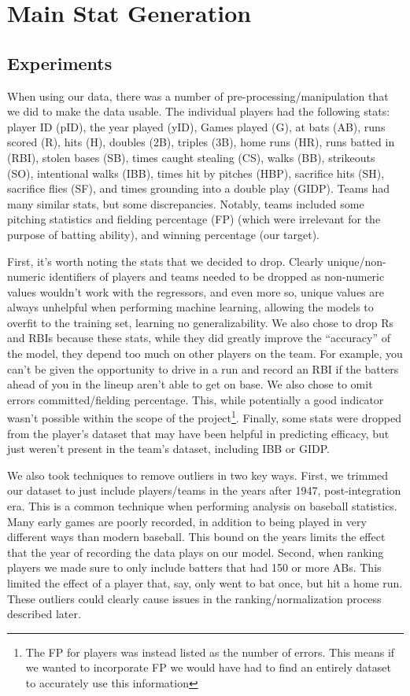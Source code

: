 \documentclass{article}
\begin{document}
\section{Main Stat Generation}
\label{mainstat}

    \subsection{Experiments}
    \label{experiments1}
    
When using our data, there was a number of pre-processing/manipulation that we did to make the data usable. The individual players had the following stats: player ID (pID), the year played (yID), Games played (G), at bats (AB), runs scored (R), hits (H), doubles (2B), triples (3B), home runs (HR), runs batted in (RBI), stolen bases (SB), times caught stealing (CS), walks (BB), strikeouts (SO), intentional walks (IBB), times hit by pitches (HBP), sacrifice hits (SH), sacrifice flies (SF), and times grounding into a double play (GIDP). Teams had many similar stats, but some discrepancies. Notably, teams included some pitching statistics and fielding percentage (FP) (which were irrelevant for the purpose of batting ability), and winning percentage (our target).

First, it’s worth noting the stats that we decided to drop. Clearly unique/non-numeric identifiers of players and teams needed to be dropped as non-numeric values wouldn’t work with the regressors, and even more so, unique values are always unhelpful when performing machine learning, allowing the models to overfit to the training set, learning no generalizability. We also chose to drop Rs and RBIs because these stats, while they did greatly improve the “accuracy” of the model, they depend too much on other players on the team. For example, you can’t be given the opportunity to drive in a run and record an RBI if the batters ahead of you in the lineup aren’t able to get on base. We also chose to omit errors committed/fielding percentage. This, while potentially a good indicator wasn’t possible within the scope of the project\footnote{The FP for players was instead listed as the number of errors. This means if we wanted to incorporate FP we would have had to find an entirely dataset to accurately use this information}. Finally, some stats were dropped from the player’s dataset that may have been helpful in predicting efficacy, but just weren’t present in the team’s dataset, including IBB or GIDP. 

We also took techniques to remove outliers in two key ways. First, we trimmed our dataset to just include players/teams in the years after 1947, post-integration era. This is a common technique when performing analysis on baseball statistics. Many early games are poorly recorded, in addition to being played in very different ways than modern baseball. This bound on the years limits the effect that the year of recording the data plays on our model. Second, when ranking players we made sure to only include batters that had 150 or more ABs. This limited the effect of a player that, say, only went to bat once, but hit a home run. These outliers could clearly cause issues in the ranking/normalization process described later.
\end{document}
